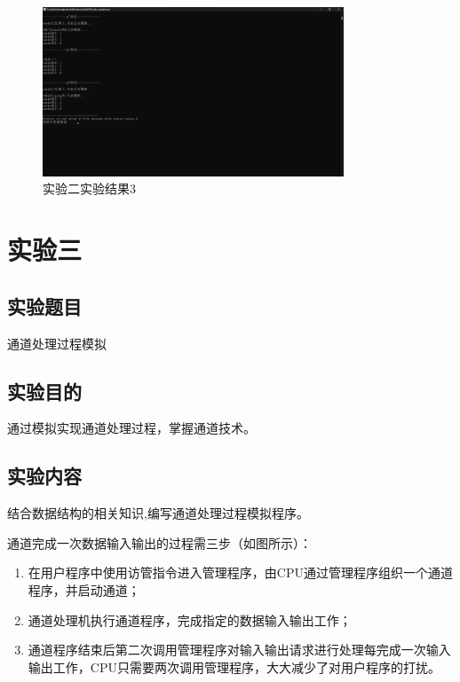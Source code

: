 \documentclass[UTF8,12pt]{article}
\begin{document}
\begin{figure}[htbp]
    \centering
    \includegraphics[width=0.8\textwidth]{imgs/5.png}
    \caption{实验二实验结果3}
\end{figure}

\newpage

\section{实验三}

\subsection{实验题目}
通道处理过程模拟

\subsection{实验目的}
通过模拟实现通道处理过程，掌握通道技术。

\subsection{实验内容}
结合数据结构的相关知识,编写通道处理过程模拟程序。

通道完成一次数据输入输出的过程需三步（如图所示）：
\begin{enumerate}
    \item 在用户程序中使用访管指令进入管理程序，由CPU通过管理程序组织一个通道程序，并启动通道；
    \item 通道处理机执行通道程序，完成指定的数据输入输出工作；
    \item 通道程序结束后第二次调用管理程序对输入输出请求进行处理每完成一次输入输出工作，CPU只需要两次调用管理程序，大大减少了对用户程序的打扰。    
\end{enumerate}
\end{document}
